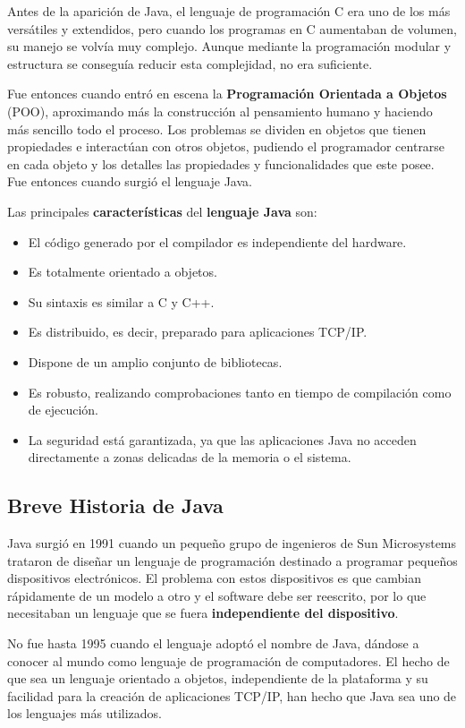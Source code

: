 Antes de la aparición de Java, el lenguaje de programación C era uno de los más versátiles y extendidos, pero cuando los programas en C aumentaban de volumen, su manejo se volvía muy complejo. Aunque mediante la programación modular y estructura se conseguía reducir esta complejidad, no era suficiente.

Fue entonces cuando entró en escena la \textbf{Programación Orientada a Objetos} (POO), aproximando más la construcción al pensamiento humano y haciendo más sencillo todo el proceso. Los problemas se dividen en objetos que tienen propiedades e interactúan con otros objetos, pudiendo el programador centrarse en cada objeto y los detalles las propiedades y funcionalidades que este posee. Fue entonces cuando surgió el lenguaje Java.

Las principales \textbf{características} del \textbf{lenguaje Java} son:

\begin{itemize}
    \item El código generado por el compilador es independiente del hardware.
    \item Es totalmente orientado a objetos.
    \item Su sintaxis es similar a C y C++.
    \item Es distribuido, es decir, preparado para aplicaciones TCP/IP.
    \item Dispone de un amplio conjunto de bibliotecas.
    \item Es robusto, realizando comprobaciones tanto en tiempo de compilación como de ejecución.
    \item La seguridad está garantizada, ya que las aplicaciones Java no acceden directamente a zonas delicadas de la memoria o el sistema.
\end{itemize}

\subsection{Breve Historia de Java}
Java surgió en 1991 cuando un pequeño grupo de ingenieros de Sun Microsystems trataron de diseñar un lenguaje de programación destinado a programar pequeños dispositivos electrónicos. El problema con estos dispositivos es que cambian rápidamente de un modelo a otro y el software debe ser reescrito, por lo que necesitaban un lenguaje que se fuera \textbf{independiente del dispositivo}.

No fue hasta 1995 cuando el lenguaje adoptó el nombre de Java, dándose a conocer al mundo como lenguaje de programación de computadores. El hecho de que sea un lenguaje orientado a objetos, independiente de la plataforma y su facilidad para la creación de aplicaciones TCP/IP, han hecho que Java sea uno de los lenguajes más utilizados.

